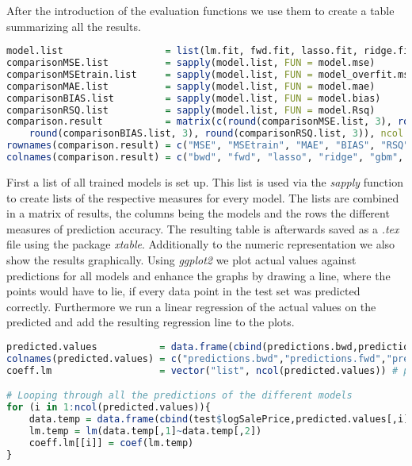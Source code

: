 After the introduction of the evaluation functions we use them to create a table summarizing all the results.
\begin{lstlisting}[language=R]
model.list                  = list(lm.fit, fwd.fit, lasso.fit, ridge.fit, gbmtuned, rftuned)
comparisonMSE.list          = sapply(model.list, FUN = model.mse)
comparisonMSEtrain.list     = sapply(model.list, FUN = model_overfit.mse)
comparisonMAE.list          = sapply(model.list, FUN = model.mae)
comparisonBIAS.list         = sapply(model.list, FUN = model.bias)
comparisonRSQ.list          = sapply(model.list, FUN = model.Rsq)
comparison.result           = matrix(c(round(comparisonMSE.list, 3), round(comparisonMSEtrain.list, 3), round(comparisonMAE.list, 3), 
    round(comparisonBIAS.list, 3), round(comparisonRSQ.list, 3)), ncol = length(model.list), byrow = TRUE)
rownames(comparison.result) = c("MSE", "MSEtrain", "MAE", "BIAS", "RSQ")
colnames(comparison.result) = c("bwd", "fwd", "lasso", "ridge", "gbm", "rf")
\end{lstlisting}
First a list of all trained models is set up. This list is used via the \textit{sapply} function to create lists of the respective measures for every model. The lists are combined in a matrix of results, the columns being the models and the rows the different measures of prediction accuracy. The resulting table is afterwards saved as a \textit{.tex} file using the package \textit{xtable}. Additionally to the numeric representation we also show the results graphically. Using \textit{ggplot2} we plot actual values against predictions for all models and enhance the graphs by drawing a line, where the points would have to lie, if every data point in the test set was predicted correctly. Furthermore we run a linear regression of the actual values on the predicted and add the resulting regression line to the plots. 
\begin{lstlisting}[language=R]
predicted.values           = data.frame(cbind(predictions.bwd,predictions.fwd,predictions.lasso,predictions.ridge,predictions.gbm,predictions.rf))
colnames(predicted.values) = c("predictions.bwd","predictions.fwd","predictions.lasso","predictions.ridge","predictions.rf","predictions.gbm")
coeff.lm                   = vector("list", ncol(predicted.values)) # preparing an empty list for coefficients of regression

# Looping through all the predictions of the different models
for (i in 1:ncol(predicted.values)){
    data.temp = data.frame(cbind(test$logSalePrice,predicted.values[,i]))
    lm.temp = lm(data.temp[,1]~data.temp[,2])
    coeff.lm[[i]] = coef(lm.temp)
}
\end{lstlisting}
